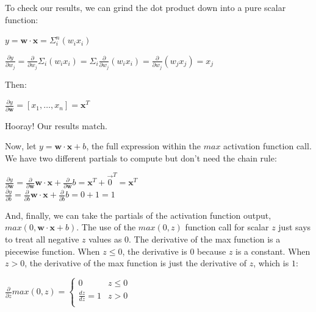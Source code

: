 \documentclass[11pt]{article}
\begin{document}
To check our results, we can grind the dot product down into a pure scalar function:

$y = \mathbf{w} \cdot \mathbf{x} = \Sigma_i^n (w_i x_i)$

$\frac{\partial y}{\partial w_j} = \frac{\partial}{\partial w_j} \Sigma_i (w_i x_i) = \Sigma_i \frac{\partial}{\partial w_j} (w_i x_i) = \frac{\partial}{\partial w_j} (w_j x_j) = x_j$

Then:

$\frac{\partial y}{\partial \mathbf{w}} = [ x_1, \ldots, x_n ] = \mathbf{x}^T$

Hooray! Our results match. 

Now, let $y = \mathbf{w} \cdot \mathbf{x} + b$, the full expression within the $max$ activation function call. We have two different partials to compute but don't need the chain rule:

$\frac{\partial y}{\partial \mathbf{w}} = \frac{\partial }{\partial \mathbf{w}}\mathbf{w} \cdot \mathbf{x} + \frac{\partial }{\partial \mathbf{w}}b = \mathbf{x}^T + \vec{0}^T = \mathbf{x}^T$\\
$\frac{\partial y}{\partial b} = \frac{\partial }{\partial b}\mathbf{w} \cdot \mathbf{x} + \frac{\partial }{\partial b}b = 0 + 1 = 1$

And, finally, we can take the partials of the activation function output, $max(0, \mathbf{w} \cdot \mathbf{x} + b)$. The use of the $max(0,z)$ function call for scalar $z$ just says to treat all negative $z$ values as 0.  The derivative of the max function is a piecewise function. When $z \leq 0$, the derivative is 0 because $z$ is a constant. When $z > 0$, the derivative of the max function is just the derivative of $z$, which is $1$:

$
\frac{\partial}{\partial z}max(0,z) =
	\begin{cases}
	0 & z \leq 0\\
	\frac{dz}{dz}=1 & z > 0\\
\end{cases}
$
\end{document}

